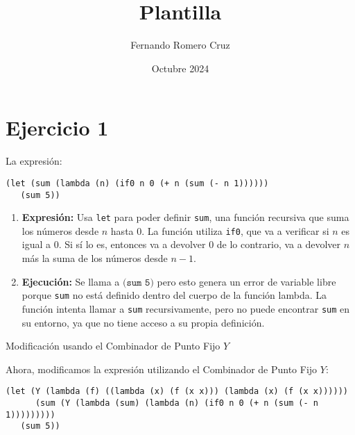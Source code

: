 \documentclass{article}
\title{Plantilla}
\author{Fernando Romero Cruz}
\date{Octubre 2024}
\begin{document}
\maketitle

\section{Ejercicio 1}

La expresión:

\begin{verbatim}
(let (sum (lambda (n) (if0 n 0 (+ n (sum (- n 1))))))
   (sum 5))
\end{verbatim}

\begin{enumerate}
    \item \textbf{Expresión:} 
    Usa \texttt{let} para poder definir \texttt{sum}, una función recursiva que suma los números desde \( n \) hasta \( 0 \). 
    La función utiliza \texttt{if0}, que va a verificar si \( n \) es igual a \( 0 \). Si sí lo es, entonces va a  devolver \( 0 \) de lo contrario, va a devolver \( n \) más la suma de los números desde \( n-1 \).

    \item \textbf{Ejecución:}
    Se llama a \( \texttt{(sum 5)} \) pero esto genera un error de variable libre porque \texttt{sum} no está definido dentro del cuerpo de la función lambda. 
    La función intenta llamar a \texttt{sum} recursivamente, pero no puede encontrar \texttt{sum} en su entorno, ya que no tiene acceso a su propia definición.
\end{enumerate}

Modificación usando el Combinador de Punto Fijo \( Y \)

Ahora, modificamos la expresión utilizando el Combinador de Punto Fijo \( Y \):

\begin{verbatim}
(let (Y (lambda (f) ((lambda (x) (f (x x))) (lambda (x) (f (x x))))))
      (sum (Y (lambda (sum) (lambda (n) (if0 n 0 (+ n (sum (- n 1)))))))))
   (sum 5))
\end{verbatim}
\end{document}
